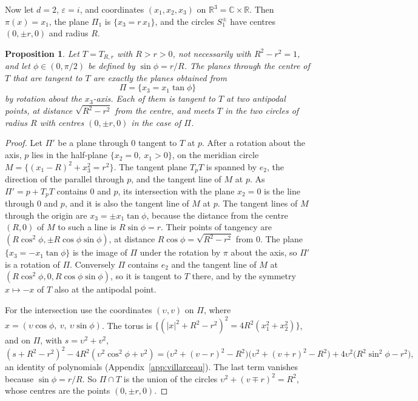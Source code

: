 \documentclass[11pt]{amsart}
\numberwithin{equation}{section}
\theoremstyle{plain}
\newtheorem{proposition}[theorem]{Proposition}
\theoremstyle{definition}
\theoremstyle{remark}
\newcommand{\R}{\mathbb{R}}
\newcommand{\C}{\mathbb{C}}
\begin{document}
Now let $d=2$, $\varepsilon=i$, and coordinates $(x_1,x_2,x_3)$ on $\R^3=\C\times\R$. Then $\pi(x)=x_1$, the plane $\Pi_1$ is $\{x_3=r\,x_1\}$, and the circles $S_1^\pm$ have centres $(0,\pm r,0)$ and radius $R$.

\begin{proposition}\label{prop:bitangent}
Let $T=T_{R,r}$ with $R>r>0$, not necessarily with $R^2-r^2=1$, and let $\phi\in(0,\pi/2)$ be defined by $\sin\phi=r/R$. The planes through the centre of $T$ that are tangent to $T$ are exactly the planes obtained from
\[
\Pi=\{x_3=x_1\tan\phi\}
\]
by rotation about the $x_3$-axis. Each of them is tangent to $T$ at two antipodal points, at distance $\sqrt{R^2-r^2}$ from the centre, and meets $T$ in the two circles of radius $R$ with centres $(0,\pm r,0)$ in the case of $\Pi$.
\end{proposition}

\begin{proof}
Let $\Pi'$ be a plane through $0$ tangent to $T$ at $p$. After a rotation about the axis, $p$ lies in the half-plane $\{x_2=0,\ x_1>0\}$, on the meridian circle $M=\{(x_1-R)^2+x_3^2=r^2\}$. The tangent plane $T_pT$ is spanned by $e_2$, the direction of the parallel through $p$, and the tangent line of $M$ at $p$. As $\Pi'=p+T_pT$ contains $0$ and $p$, its intersection with the plane $x_2=0$ is the line through $0$ and $p$, and it is also the tangent line of $M$ at $p$. The tangent lines of $M$ through the origin are $x_3=\pm x_1\tan\phi$, because the distance from the centre $(R,0)$ of $M$ to such a line is $R\sin\phi=r$. Their points of tangency are $(R\cos^2\phi,\pm R\cos\phi\sin\phi)$, at distance $R\cos\phi=\sqrt{R^2-r^2}$ from $0$. The plane $\{x_3=-x_1\tan\phi\}$ is the image of $\Pi$ under the rotation by $\pi$ about the axis, so $\Pi'$ is a rotation of $\Pi$. Conversely $\Pi$ contains $e_2$ and the tangent line of $M$ at $(R\cos^2\phi,0,R\cos\phi\sin\phi)$, so it is tangent to $T$ there, and by the symmetry $x\mapsto-x$ of $T$ also at the antipodal point.

For the intersection use the coordinates $(\upsilon,v)$ on $\Pi$, where $x=(\upsilon\cos\phi,\ v,\ \upsilon\sin\phi)$. The torus is $\{(|x|^2+R^2-r^2)^2=4R^2(x_1^2+x_2^2)\}$, and on $\Pi$, with $s=\upsilon^2+v^2$,
\[
(s+R^2-r^2)^2-4R^2(\upsilon^2\cos^2\phi+v^2)
=\bigl(\upsilon^2+(v-r)^2-R^2\bigr)\bigl(\upsilon^2+(v+r)^2-R^2\bigr)+4\upsilon^2\bigl(R^2\sin^2\phi-r^2\bigr),
\]
an identity of polynomials (Appendix~\ref{app:villarceau}). The last term vanishes because $\sin\phi=r/R$. So $\Pi\cap T$ is the union of the circles $\upsilon^2+(v\mp r)^2=R^2$, whose centres are the points $(0,\pm r,0)$.
\end{proof}
\end{document}
